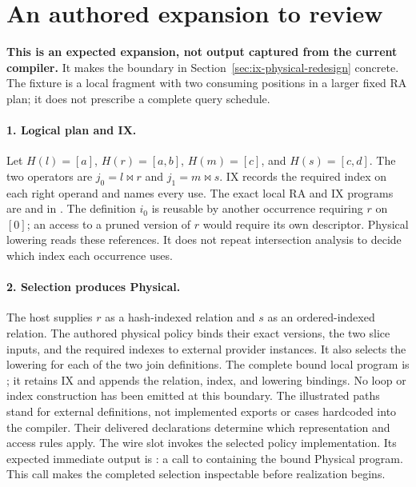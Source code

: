 \section{An authored expansion to review}
\label{sec:overview}
\textbf{This is an expected expansion, not output captured from the current
compiler.} It makes the boundary in Section~\ref{sec:ix-physical-redesign}
concrete. The fixture is a local fragment with two consuming positions in a
larger fixed RA plan; it does not prescribe a complete query schedule.

\paragraph{1. Logical plan and IX.}
Let $H(l)=[a]$, $H(r)=[a,b]$, $H(m)=[c]$, and $H(s)=[c,d]$.
The two operators are $j_0=l\bowtie r$ and $j_1=m\bowtie s$.
IX records the required index on each right operand and names every use.
The exact local RA and IX programs are  and
 in .
The definition $i_0$ is reusable by another occurrence requiring $r$ on
$[0]$; an access to a pruned version of $r$ would require its own descriptor.
Physical lowering reads these references. It does not repeat intersection
analysis to decide which index each occurrence uses.

\paragraph{2. Selection produces Physical.}
The host supplies $r$ as a hash-indexed relation and $s$ as an ordered-indexed
relation. The authored physical policy binds their exact versions, the two
slice inputs, and the required indexes to external provider instances.
It also selects the lowering for each of the two join definitions. The complete
bound local program is ; it retains IX and appends
the relation, index, and lowering bindings. No loop or index construction has
been emitted at this boundary.
The illustrated paths stand for external definitions, not implemented exports
or cases hardcoded into the compiler.
Their delivered declarations determine which representation and access rules
apply. The wire slot  invokes the selected policy
implementation. Its expected immediate output is :
a call to  containing the bound Physical program.
This call makes the completed selection inspectable before realization begins.

